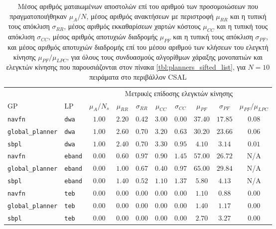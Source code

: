 \begin{table}[h]\hspace{-0.5cm}
\renewcommand{\arraystretch}{1.3}
\begin{tabular}{llcccccccc}
& & \multicolumn{8}{c}{Μετρικές επίδοσης ελεγκτών κίνησης} \\
\cline{3-10}
  GP & LP & $\mu_{A} / N_s$ & $\mu_{RR}$ & $\sigma_{RR}$ & $\mu_{CC}$ & $\sigma_{CC}$ & $\mu_{PF}$ & $\sigma_{PF}$ & $\mu_{PF} / \mu_{LPC}$ \\ \toprule
  \texttt{navfn} & \texttt{dwa} & $1.00$ & $2.20$ & $0.42$ & $3.00$ & $0.00$ & $37.40$ & $17.85$ & $0.08$ \\
  \texttt{global\_planner} & \texttt{dwa} & $1.00$ & $2.60$ & $0.70$ & $3.20$ & $0.63$ & $30.20$ & $23.66$ & $0.06$ \\
  \texttt{sbpl} & \texttt{dwa} & $1.00$ & $2.40$ & $0.70$ & $3.30$ & $0.95$ & $4.10$ & $3.14$ & $0.01$ \\
  \texttt{navfn} & \texttt{eband} & $0.00$ & $0.60$ & $0.97$ & $0.90$ & $1.45$ & $57.00$ & $26.72$ & N/A \\
  \texttt{global\_planner} & \texttt{eband} & $0.00$ & $1.00$ & $0.67$ & $0.40$ & $0.97$ & $65.00$ & $29.84$ & N/A \\
  \texttt{sbpl} & \texttt{eband} & $0.00$ & $1.40$ & $0.52$ & $1.10$ & $1.37$ & $5.80$ & $4.13$ & N/A \\
  \texttt{navfn} & \texttt{teb} & $0.00$ & $0.00$ & $0.00$ & $0.00$ & $0.00$ & $1.10$ & $0.88$ & $0.00$ \\
  \texttt{global\_planner} & \texttt{teb} & $0.00$ & $0.00$ & $0.00$ & $0.00$ & $0.00$ & $1.40$ & $1.17$ & $0.00$ \\
  \texttt{sbpl} & \texttt{teb} & $0.00$ & $0.00$ & $0.00$ & $0.00$ & $0.00$ & $2.70$ & $3.27$ & $0.00$ \\ \bottomrule
\end{tabular}
\caption{\small Μέσος αριθμός ματαιωμένων αποστολών επί του αριθμού των
      προσομοιώσεων που πραγματοποιήθηκαν $\mu_A / N$, μέσος αριθμός ανακτήσεων
      με περιστροφή $\mu_{RR}$ και η τυπική τους απόκλιση $\sigma_{RR}$, μέσος
      αριθμός εκκαθαρίσεων χαρτών κόστους $\mu_{CC}$ και η τυπική τους απόκλιση
      $\sigma_{CC}$, μέσος αριθμός αποτυχιών διαδρομής $\mu_{PF}$ και η τυπική
      τους απόκλιση $\sigma_{PF}$, και μέσος αριθμός αποτυχιών διαδρομής επί
      του μέσου αριθμού των κλήσεων του ελεγκτή κίνησης $\mu_{PF} / \mu_{LPC}$,
      για όλους τους συνδυασμούς αλγορίθμων χάραξης μονοπατιών και ελεγκτών
      κίνησης που παρουσιάζονται στον πίνακα \ref{tbl:planners_sifted_list},
      για $N=10$ πειράματα στο περιβάλλον CSAL}
\label{tbl:info_failures_csal}
\end{table}



